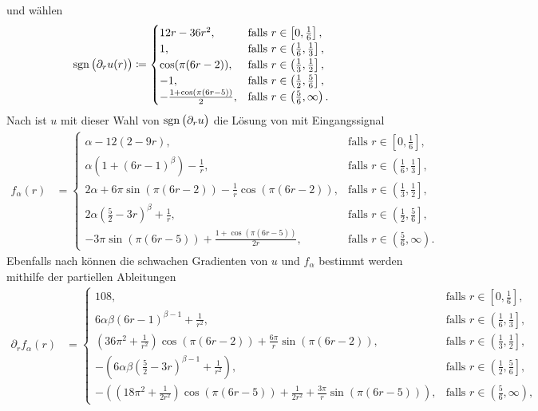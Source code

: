 und wählen
\begin{align*}
  \operatorname{sgn}\big(\partial_r u(r)\big) 
  &\coloneqq
  \begin{cases}
    12r-36r^2, 
    & \text{falls } r\in \left[0,\frac{1}{6}\right],\\
    1, 
    & \text{falls } r\in \left(\frac{1}{6}, \frac{1}{3}\right],\\
    \cos(\pi(6r-2)), 
    & \text{falls } r\in \left(\frac{1}{3}, \frac{1}{2}\right],\\
    -1, 
    & \text{falls } r\in \left(\frac{1}{2}, \frac{5}{6}\right],\\
    -\frac{1+\cos(\pi(6r-5))}{2}, 
    & \text{falls } r\in \left(\frac{5}{6}, \infty\right).
  \end{cases}
\end{align*}
Nach  ist $u$ mit dieser Wahl von
$\operatorname{sgn}\big(\partial_r u\big)$ die Lösung von  mit
Eingangssignal
\begin{align}
  \label{eq:inputSignalF01}
  f_\alpha(r)
  &=
  \begin{cases}
    \alpha-12(2-9r), 
    & \text{falls } r\in \left[0,\frac{1}{6}\right],\\
    \alpha\left(1+(6r-1)^\beta\right)-\frac{1}{r}, 
    & \text{falls } r\in \left(\frac{1}{6}, \frac{1}{3}\right],\\
    2\alpha+6\pi\sin(\pi(6r-2))-\frac{1}{r}\cos(\pi(6r-2)), 
    & \text{falls } r\in \left(\frac{1}{3}, \frac{1}{2}\right],\\
    2\alpha\left(\frac{5}{2}-3r\right)^\beta+\frac{1}{r},
    & \text{falls } r\in \left(\frac{1}{2}, \frac{5}{6}\right],\\
    -3\pi\sin(\pi(6r-5))+\frac{1+\cos(\pi(6r-5))}{2r}, 
    & \text{falls } r\in \left(\frac{5}{6}, \infty\right).
  \end{cases}
\end{align}
Ebenfalls nach  können die schwachen
Gradienten von $u$ und $f_\alpha$ bestimmt werden mithilfe der partiellen 
Ableitungen
\begin{align*}
  \partial_r f_\alpha(r)
  &=
  \begin{cases}
    108,
    & \text{falls } r\in\left[0,\frac{1}{6}\right],\\
    6\alpha\beta(6r-1)^{\beta-1} +\frac{1}{r^2}, 
    & \text{falls } r\in\left(\frac{1}{6},\frac{1}{3}\right],\\
    \left(36\pi^2+\frac{1}{r^2}\right)\cos(\pi(6r-2))
    + \frac{6\pi}{r}\sin(\pi(6r-2)), 
    & \text{falls } r\in\left(\frac{1}{3},\frac{1}{2}\right],\\
    -\left(6\alpha\beta\left( \frac{5}{2}-3r \right)^{\beta-1}+
    \frac{1}{r^2}\right),
    & \text{falls } r\in\left(\frac{1}{2},\frac{5}{6}\right],\\
    -\left( \left( 18\pi^2+\frac{1}{2r^2} \right)\cos(\pi(6r-5))
    +\frac{1}{2r^2} + \frac{3\pi}{r}\sin(\pi(6r-5))\right), 
    &\text{falls } r\in\left(\frac{5}{6},\infty\right),
  \end{cases}
\end{align*}

